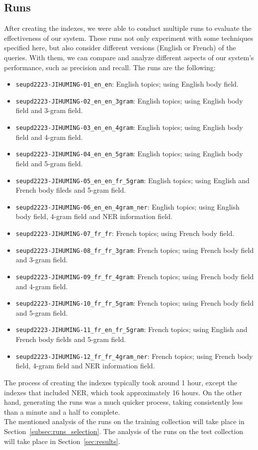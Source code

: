 \subsection{Runs}\label{subsec:runs}

After creating the indexes, we were able to conduct multiple runs to evaluate the effectiveness of our system.
These runs not only experiment with some techniques specified here, but also consider different versions (English
or French) of the queries.
With them, we can compare and analyze different aspects of our system's performance, such as precision and recall.
The runs are the following:
\begin{itemize}
	\item \texttt{seupd2223-JIHUMING-01\_en\_en}: English topics; using English body field.
	\item \texttt{seupd2223-JIHUMING-02\_en\_en\_3gram}: English topics; using English body field and 3-gram field.
	\item \texttt{seupd2223-JIHUMING-03\_en\_en\_4gram}: English topics; using English body field and 4-gram field.
	\item \texttt{seupd2223-JIHUMING-04\_en\_en\_5gram}: English topics; using English body field and 5-gram field.
	\item \texttt{seupd2223-JIHUMING-05\_en\_en\_fr\_5gram}: English topics; using English and French body fileds and 5-gram field.
	\item \texttt{seupd2223-JIHUMING-06\_en\_en\_4gram\_ner}: English topics; using English body field, 4-gram field and NER information field.
	\item \texttt{seupd2223-JIHUMING-07\_fr\_fr}: French topics; using French body field.
	\item \texttt{seupd2223-JIHUMING-08\_fr\_fr\_3gram}: French topics; using French body field and 3-gram field.
	\item \texttt{seupd2223-JIHUMING-09\_fr\_fr\_4gram}: French topics; using French body field and 4-gram field.
	\item \texttt{seupd2223-JIHUMING-10\_fr\_fr\_5gram}: French topics; using French body field and 5-gram field.
	\item \texttt{seupd2223-JIHUMING-11\_fr\_en\_fr\_5gram}: French topics; using English and French body fields and 5-gram field.
	\item \texttt{seupd2223-JIHUMING-12\_fr\_fr\_4gram\_ner}: French topics; using French body field, 4-gram field and NER information field.
\end{itemize}

The process of creating the indexes typically took around 1 hour, except the indexes that included NER, which took
approximately 16 hours.
On the other hand, generating the runs was a much quicker process, taking consistently less than a minute and a half to
complete.\\

The mentioned analysis of the runs on the training collection will take place in Section~\ref{subsec:runs_selection}.
The analysis of the runs on the test collection will take place in Section~\ref{sec:results}.